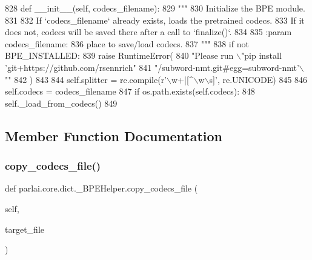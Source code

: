 \begin{DoxyCode}
828     \textcolor{keyword}{def }\_\_init\_\_(self, codecs\_filename):
829         \textcolor{stringliteral}{"""}
830 \textcolor{stringliteral}{        Initialize the BPE module.}
831 \textcolor{stringliteral}{}
832 \textcolor{stringliteral}{        If `codecs\_filename` already exists, loads the pretrained codecs.}
833 \textcolor{stringliteral}{        If it does not, codecs will be saved there after a call to `finalize()`.}
834 \textcolor{stringliteral}{}
835 \textcolor{stringliteral}{        :param codecs\_filename:}
836 \textcolor{stringliteral}{            place to save/load codecs.}
837 \textcolor{stringliteral}{        """}
838         \textcolor{keywordflow}{if} \textcolor{keywordflow}{not} BPE\_INSTALLED:
839             \textcolor{keywordflow}{raise} RuntimeError(
840                 \textcolor{stringliteral}{"Please run \(\backslash\)"pip install 'git+https://github.com/rsennrich"}
841                 \textcolor{stringliteral}{"/subword-nmt.git#egg=subword-nmt'\(\backslash\)""}
842             )
843 
844         self.splitter = re.compile(\textcolor{stringliteral}{r'\(\backslash\)w+|[^\(\backslash\)w\(\backslash\)s]'}, re.UNICODE)
845 
846         self.codecs = codecs\_filename
847         \textcolor{keywordflow}{if} os.path.exists(self.codecs):
848             self.\_load\_from\_codecs()
849 
\end{DoxyCode}


\subsection{Member Function Documentation}
\mbox{\label{classparlai_1_1core_1_1dict_1_1__BPEHelper_a712c4482ea0dc907543effce64bd8145}} 
\subsubsection{\texorpdfstring{copy\+\_\+codecs\+\_\+file()}{copy\_codecs\_file()}}
{\footnotesize\ttfamily def parlai.\+core.\+dict.\+\_\+\+B\+P\+E\+Helper.\+copy\+\_\+codecs\+\_\+file (\begin{DoxyParamCaption}\item[{}]{self,  }\item[{}]{target\+\_\+file }\end{DoxyParamCaption})}

